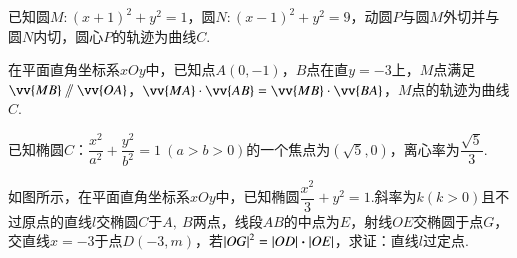 \documentclass{BHCexam}
\begin{document}
\begin{questions}
\newpage
\qs 已知圆$M:(x+1)^2+y^2=1$，圆$N:(x-1)^2+y^2=9$，动圆$P$与圆$M$外切并与圆$N$内切，圆心$P$的轨迹为曲线$C$.
\kongbai
\qs 
在平面直角坐标系$xOy$中，已知点$A(0,-1)$，$B$点在直$y=-3$上，$M$点满足$\vv{MB}\sslash\vv{OA}$，$\vv{MA}\cdot\vv{AB}=\vv{MB}\cdot\vv{BA}$，$M$点的轨迹为曲线$C$.
\newpage
\qs 已知椭圆$C$：$\dfrac{x^2}{a^2}+\dfrac{y^2}{b^2}=1~(a>b>0)$的一个焦点为$ (\sqrt{5},0) $，离心率为$ \dfrac{\sqrt{5}}{3} $.
\kongbai 
\qs 如图所示，在平面直角坐标系$ xOy $中，已知椭圆$ \dfrac{x^2}{3}+y^2=1. $斜率为$ k (k>0)$且不过原点的直线$ l $交椭圆$ C $于$A,~B  $两点，线段$ AB $的中点为$ E $，射线$ OE $交椭圆于点$ G $，交直线$ x=-3 $于点$ D(-3,m) $，若$\left| OG \right|^2=\left| OD \right|\bm{\cdot}\left| OE \right| $，求证：直线$ l $过定点.


\end{questions}
\end{document}

